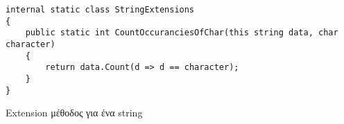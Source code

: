 \begin{listing}[htbp]
\begin{verbatim}
internal static class StringExtensions
{
    public static int CountOccuranciesOfChar(this string data, char character)
    {
        return data.Count(d => d == character);
    }
}
\end{verbatim}
\caption{Extension μέθοδος για ένα string}
\label{stringExtensions}
\end{listing}